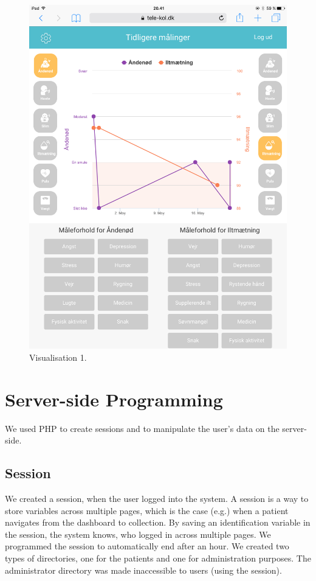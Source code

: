 \begin{figure}[h]
\begin{minipage}[b]{0.45\textwidth}
    \includegraphics[width=\textwidth]{images/implementation/v1Imp.PNG}
    \caption{Visualisation 1.}
    \label{fig:visualization}
  \end{minipage}
\end{figure}

\section{Server-side Programming}
We used PHP to create sessions and to manipulate the user's data on the server-side. 

\subsection{Session}
We created a session, when the user logged into the system. A session is a way to store variables across multiple pages, which is the case (e.g.) when a patient navigates from the dashboard to collection. By saving an identification variable in the session, the system knows, who logged in across multiple pages. We programmed the session to automatically end after an hour. We created two types of directories, one for the patients and one for administration purposes. The administrator directory was made inaccessible to users (using the session).

